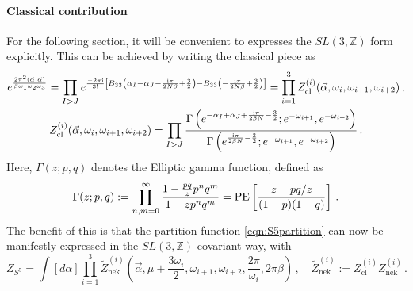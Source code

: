 \documentclass[main.tex]{subfiles}
\begin{document}
\paragraph{Classical contribution}
For the following section, it will be convenient to expresses the $SL(3,\mathbb{Z})$ form explicitly. This can be achieved by writing the classical piece as \cite{Nieri:2013vba}
\begin{gather}
e^{\frac{2\pi^2(\vec{\alpha},\vec{\alpha})}{\beta\omega_1\omega_2\omega_3}}=\prod_{I>J}e^{\frac{-2\pi\mathrm{i}}{3!}\left[B_{33}\left(\alpha_I-\alpha_J-\frac{\mathrm{i}\pi}{2N\beta}+\frac{3}{2}\right)-B_{33}\left(-\frac{\mathrm{i}\pi}{2N\beta}+\frac{3}{2}\right)\right]}=\prod_{i=1}^3Z^{(i)}_{\text{cl}}(\vec{\alpha},\omega_i,\omega_{i+1},\omega_{i+2})\,,\\
Z^{(i)}_{\text{cl}}(\vec{\alpha},\omega_i,\omega_{i+1},\omega_{i+2})=\prod_{I>J}\frac{\Gamma\left(e^{-\alpha_I+\alpha_J+\frac{\mathrm{i}\pi}{2\beta N}-\frac{3}{2}};e^{-\omega_{i+1}},e^{-\omega_{i+2}}\right)}{\Gamma\left(e^{\frac{\mathrm{i}\pi}{2\beta N}-\frac{3}{2}};e^{-\omega_{i+1}},e^{-\omega_{i+2}}\right)}\,.
\end{gather}
Here, $\Gamma(z;p,q)$ denotes the Elliptic gamma function, defined as
\begin{equation}
\Gamma(z;p,q):=\prod_{n,m=0}^{\infty}\frac{1-\frac{pq}{z}p^nq^m}{1-zp^nq^m}=\operatorname{\mathrm{PE}}\left[\frac{z-pq/z}{(1-p)(1-q)}\right]\,.
\end{equation}
The benefit of this is that the partition function \eqref{eqn:S5partition} can now be manifestly expressed in the $SL(3,\mathbb{Z})$ covariant way, with
\begin{equation}\label{eqn:S5partitionmanifest}
Z_{S^5}=\int[d\alpha]\prod_{i=1}^3\widetilde{Z}^{(i)}_{\text{nek}}\left(\vec{\alpha},\mu+\frac{3\omega_i}{2},\omega_{i+1},\omega_{i+2},\frac{2\pi}{\omega_i},2\pi\beta\right)\,,\quad
\widetilde{Z}^{(i)}_{\text{nek}}:=Z^{(i)}_{\text{cl}}Z^{(i)}_{\text{nek}}\,.
\end{equation}
\end{document}
